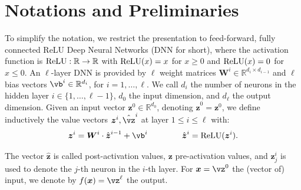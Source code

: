 \section{Notations and Preliminaries}
\label{s.notation}

	To simplify the notation, we restrict the presentation to feed-forward, 
	fully connected ReLU Deep Neural Networks (DNN for short), where the activation function is $\mathrm{ReLU}: \mathbb{R} \rightarrow \mathbb{R}$ with
	$\mathrm{ReLU}(x)=x$ for $x \geq 0$ and $\mathrm{ReLU}(x)=0$ for $x \leq 0$.
	An $\ell$-layer DNN is provided by $\ell$ weight matrices 
	$\boldsymbol{W}^i \in \mathbb{R}^{d_i\times d_{i-1}}$
	and $\ell$ bias vectors $\vb^i \in \mathbb{R}^{d_i}$, for $i=1, \ldots, \ell$.
	We call $d_i$ the number of neurons in the hidden layer 
	$i \in \{1, \ldots, \ell-1\}$,
	$d_0$ the input dimension, and $d_\ell$ the output dimension.
	Given an input vector $\boldsymbol{z}^0 \in \mathbb{R}^{d_0}$, 
	denoting $\hat{\boldsymbol{z}}^{0}={\boldsymbol{z}}^0$, we define inductively the value vectors $\boldsymbol{z}^i,\hat{\vz}^i$ at layer $1 \leq i \leq \ell$ with:
	\begin{align*}
		\boldsymbol{z}^{i} = \boldsymbol{W}^i\cdot \hat{\boldsymbol{z}}^{i-1}+ \vb^i \qquad \, \qquad
		\hat{\boldsymbol{z}}^{i} = \ReLU({\boldsymbol{z}}^i).
	\end{align*} 
	
\vspace{-0.4cm}

	The vector $\hat{\boldsymbol{z}}$ is called post-activation values, $\boldsymbol{z}$ pre-activation values, 
	and $\boldsymbol{z}^{i}_j$ is used to denote the $j$-th neuron in the $i$-th layer. 
	For $\boldsymbol{x}=\vz^0$ the (vector of) input, we denote by $f(\boldsymbol{x})=\vz^\ell$ the output. %
	
     
	
